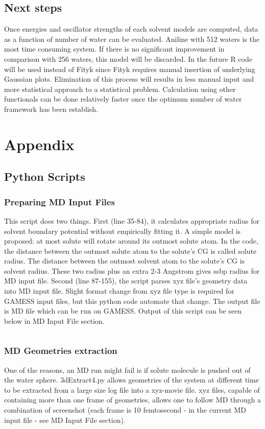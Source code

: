 \documentclass[
journal=jpcbfk, %
manuscript=article]{achemso}
\begin{document}
\subsection{Next steps}
Once energies and oscillator strengths of each solvent models are computed, data as a function of number of water can be evaluated. Aniline with 512 waters is the most time consuming system. If there is no significant improvement in comparison with 256 waters, this model will be discarded. 
In the future R code will be used instead of Fityk since Fityk requires manual insertion of underlying Gaussian plots. Elimination of this process will results in less manual input and more statistical approach to a statistical problem. Calculation using other functionals can be done relatively faster once the optimum number of water framework has been establish.

\clearpage
\appendix 
\label{appendix}
\section*{Appendix}
\renewcommand{\thesubsection}{\Alph{sub}}
	\subsection{Python Scripts}
		\subsubsection{Preparing MD Input Files}
			This script does two things. First (line 35-84), it calculates appropriate radius for solvent boundary potential without empirically fitting it. A simple model is proposed: at most solute will rotate around its outmost solute atom. In the code, the distance between the outmost solute atom to the solute's CG is called solute radius. The distance between the outmost solvent atom to the solute's CG is solvent radius. These two radius plus an extra 2-3 Angstrom gives ssbp radius for MD input file. Second (line 87-155), the script parses xyz file's geometry data into MD input file. Slight format change from xyz file type is required for GAMESS input files, but this python code automate that change. The output file is MD file which can be run on GAMESS. Output of this script can be seen below in MD Input File section.
			\inputminted[linenos, breaklines, baselinestretch=1, fontsize=\small]{python}{../pythonScripts/prepareMD2.py}
		
		\subsubsection{MD Geometries extraction}
			One of the reasons, an MD run might fail is if solute molecule is pushed out of the water sphere. 3dExtract4.py allows geometries of the system at different time to be extracted from a large size log file into a xyz-movie file. xyz files, capable of containing more than one frame of geometries, allows one to follow MD through a combination of screenshot (each frame is 10 femtosecond - in the current MD input file - see MD Input File section). 
			\inputminted[linenos, breaklines, baselinestretch=1, fontsize=\small]{python}{../pythonScripts/3dExtract4.py}
			
\end{document}
